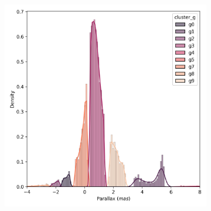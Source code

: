 \documentclass[11pt,a4paper,english,twocolumn]{article}
\begin{document}
\begin{figure}[!hbt]
\begin{subfigure}{0.3\textwidth}
  \end{subfigure}
  \begin{subfigure}{0.3\textwidth}
    \includegraphics[width=\textwidth]{../figures/ngc_2632/dec_parallax_filtered_ngc_2632.png}
  \end{subfigure}


\end{figure}
\end{document}
